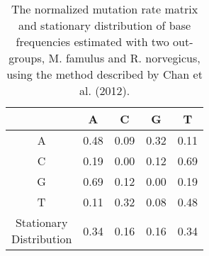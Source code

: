 \begin{table}
\caption{The normalized mutation rate matrix and stationary distribution of base frequencies estimated with two out-groups, M. famulus and R. norvegicus, using the method described by Chan et al. (2012).}
	\begin{tabular} {c c c c c} \\ [ 0.5ex ] \hline
 & A & C & G & T \\ \hline
A & 0.48 & 0.09 & 0.32 & 0.11 \\
C & 0.19 & 0.00 & 0.12 & 0.69 \\
G & 0.69 & 0.12 & 0.00 & 0.19 \\
T & 0.11 & 0.32 & 0.08 & 0.48 \\ \hline
\makecell{Stationary \\ Distribution} & 0.34 & 0.16 & 0.16 & 0.34 \\ \hline

\end{tabular}
\end{table}

